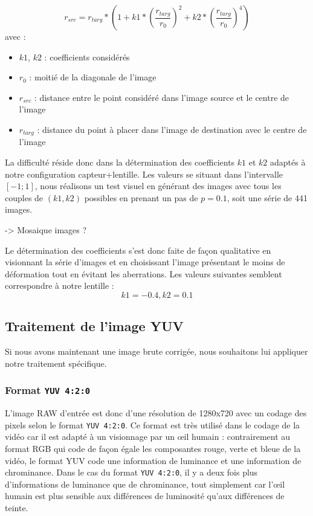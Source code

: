 \documentclass[11pt,a4paper]{article}
\begin{document}
$$r_{src} = r_{targ} * (1 + k1*(\frac{r_{targ}}{r_0})^2 + k2*(\frac{r_{targ}}{r_0})^4)$$
avec :
\begin{itemize}
\item{$k1$, $k2$ : coefficients considérés}
\item{$r_0$ : moitié de la diagonale de l'image}
\item{$r_{src}$ : distance entre le point considéré dans l'image source et le centre de l'image}
\item{$r_{targ}$ : distance du point à placer dans l'image de destination avec le centre de l'image}
\end{itemize}

\bigbreak

La difficulté réside donc dans la détermination des coefficients $k1$ et $k2$ adaptés à notre configuration capteur+lentille.
Les valeurs se situant dans l'intervalle $[-1;1]$, nous réalisons un test visuel en générant des images avec tous les couples de $(k1, k2)$ possibles en prenant un pas de $p=0.1$, soit une série de 441 images.

\bigbreak
-> Mosaique images ?

\bigbreak
Le détermination des coefficients s'est donc faite de façon qualitative en visionnant la série d'images et en choisissant l'image présentant le moins de déformation tout en évitant les aberrations.
Les valeurs suivantes semblent correspondre à notre lentille :
$$k1 = -0.4, k2 = 0.1$$

\subsection{Traitement de l'image YUV}
Si nous avons maintenant une image brute corrigée, nous souhaitons lui appliquer notre traitement spécifique.

\subsubsection{Format \texttt{YUV 4:2:0}}
L'image RAW d'entrée est donc d'une résolution de 1280x720 avec un codage des pixels selon le format \texttt{YUV 4:2:0}.
Ce format est très utilisé dans le codage de la vidéo car il est adapté à un visionnage par un œil humain : contrairement au format RGB qui code de façon égale les composantes rouge, verte et bleue de la vidéo, le format YUV code une information de luminance et une information de chrominance.
Dans le cas du format \texttt{YUV 4:2:0}, il y a deux fois plus d'informations de luminance que de chrominance, tout simplement car l'œil humain est plus sensible aux différences de luminosité qu'aux différences de teinte.
\end{document}
